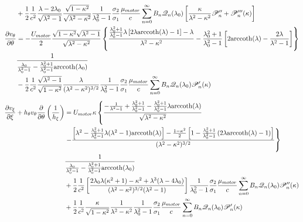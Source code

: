 \documentclass[fontsize=11pt, %
                             paper=a4, %
                             twoside, %
                             captions=tableheading,
                             index=totoc,
                             hyperref]{labbook}
\begin{document}
\begin{addmargin}[4cm]{0cm}
\begin{equation}
\begin{aligned}
&+\frac{1}{2}\frac{1}{c^2}\frac{\lambda-2\lambda_0}{\sqrt{\lambda^2-1}}\frac{\sqrt{1-\kappa^2}}{\sqrt{\lambda^2-\kappa^2}}\frac{1}{\lambda_0^2-1}\frac{\sigma_2}{\sigma_1}\frac{\mu_{motor}}{c}\sum_{n=0}^\infty B_n \mathscr{Q}_n(\lambda_0)\left[\frac{\kappa}{\lambda^2-\kappa^2}\mathscr{P}_n^{\prime\prime}+\mathscr{P}_n^{\prime\prime\prime}(\kappa)\right]\\
\frac{\partial v_\theta}{\partial \theta}&=-\frac{U_{motor}}{2}\frac{\sqrt{1-\kappa^2}\sqrt{\lambda^2-1}}{\sqrt{\lambda^2-\kappa^2}}\left\{\frac{\frac{\lambda_0^2+1}{\lambda_0^2-1}\lambda\left[2\lambda\mathrm{arccoth}(\lambda)-1\right]-\lambda}{\lambda^2-\kappa^2}-\frac{\lambda_0^2+1}{\lambda_0^2-1}\left[2\mathrm{arccoth}(\lambda)-\frac{2\lambda}{\lambda^2-1}\right]\right\}\\
&\frac{1}{\frac{\lambda_0}{\lambda_0^2-1}-\frac{\lambda_0^2+1}{\lambda_0^2-1}\mathrm{arccoth}(\lambda_0)}\\
&-\frac{1}{2}\frac{1}{c^2}\frac{\sqrt{\lambda^2-1}}{\sqrt{1-\kappa^2}}\frac{\lambda}{(\lambda^2-\kappa^2)^{3/2}}\frac{1}{\lambda_0^2-1}\frac{\sigma_2}{\sigma_1}\frac{\mu_{motor}}{c}\sum_{n=0}^\infty B_n \mathscr{Q}_n(\lambda_0)\mathscr{P}_n^\prime(\kappa)\\
\end{aligned}
\end{equation}
\begin{equation}
\begin{aligned}
\pd{v_\xi}{\xi}+h_\theta v_\theta \pd{}{\theta}\left(\frac{1}{h_\xi}\right)&=U_{motor}\kappa\left\{\frac{-\frac{1}{\lambda^2-1}+\frac{\lambda_0^2+1}{\lambda_0^2-1}-\frac{\lambda_0^2+1}{\lambda_0^2-1}\lambda\mathrm{arccoth}(\lambda)}{\sqrt{\lambda^2-\kappa^2}}\right.\\
&\left.-\frac{\left[\lambda^2-\frac{\lambda_0^2+1}{\lambda_0^2-1}\lambda(\lambda^2-1)\mathrm{arccoth}(\lambda)\right]-\frac{1-\kappa^2}{2}\left[1-\frac{\lambda_0^2+1}{\lambda_0^2-1}\left(2\lambda\mathrm{arccoth}(\lambda)-1\right)\right]}{(\lambda^2-\kappa^2)^{3/2}} \right\}\\
&\frac{1}{\frac{\lambda_0}{\lambda_0^2-1}-\frac{\lambda_0^2+1}{\lambda_0^2-1}\mathrm{arccoth}(\lambda_0)}\\
&+\frac{1}{2}\frac{1}{c^2}\left[\frac{2\lambda_0\lambda(\kappa^2+1)-\kappa^2+\lambda^3(\lambda-4\lambda_0)}{(\lambda^2-\kappa^2)^{3/2}(\lambda^2-1)}\right]\frac{1}{\lambda_0^2-1}\frac{\sigma_2}{\sigma_1}\frac{\mu_{motor}}{c}\sum_{n=0}^\infty B_n \mathscr{Q}_n(\lambda_0)\mathscr{P}_n^{\prime\prime}(\kappa)\\
&+\frac{1}{2}\frac{1}{c^2}\frac{\kappa}{\sqrt{1-\kappa^2}}\frac{1}{\lambda^2-\kappa^2}\frac{1}{\lambda_0^2-1}\frac{\sigma_2}{\sigma_1}\frac{\mu_{motor}}{c}\sum_{n=0}^\infty B_n \mathscr{Q}_n(\lambda_0)\mathscr{P}_n^\prime(\kappa)

\end{aligned}
\end{equation}
\end{addmargin}
\end{document}
